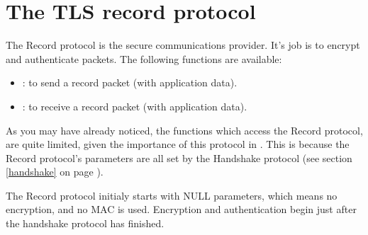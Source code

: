 \section{The TLS record protocol}

The Record protocol is the secure communications provider. It's job is
to encrypt and authenticate packets. 
The following functions are available:
\par
\begin{itemize}
\item {}:
to send a record packet (with application data).
\item {}:
to receive a record packet (with application data).
\end{itemize}

As you may have already noticed, the functions which access the Record protocol,
are quite limited, given the importance of this protocol in \tls{}.
This is because the Record protocol's parameters are all set by
the Handshake protocol (see section \ref{handshake} on page \pageref{handshake}).
\par
The Record protocol initialy starts with NULL parameters, which means
no encryption, and no MAC is used. Encryption and authentication begin
just after the handshake protocol has finished.



